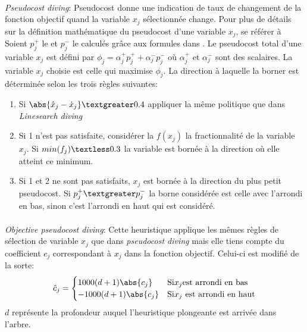 \documentclass[12pt,a4paper,oneside]{book}
\theoremstyle{definition}
\begin{document}
	\paragraph{}
	\textit{Pseudocost diving}: Pseudocost donne une indication de taux de changement de la fonction objectif quand la variable $x_j$ sélectionnée change.
	Pour plus de détails sur la définition mathématique du pseudocost d'une variable $x_j$, se référer à \cite{martin1999integer}
	Soient $p^+_j$ le  et $p^-_j$ le  calculés grâce aux formules dans \cite{martin1999integer}. Le pseudocost total d'une variable $x_j$ est défini par $ \phi_j = \alpha^+_j p^+_j + \alpha^-_j p^-_j$ où $\alpha^+_j$ et $\alpha^-_j$ sont des scalaires. La variable $x_j$ choisie est celle qui maximise $\phi_j$. La direction à laquelle la borner est déterminée selon les trois règles suivantes:
	\begin{enumerate}
		\item Si $\abs{\hat{x}_j - \dot{x}_j} \textgreater 0.4$ appliquer la même politique que dans \textit{Linesearch diving}
		\item Si 1 n'est pas satisfaite, considérer la $f(x_j)$ la fractionnalité de la variable $x_j$. Si $min(f_j) \textless 0.3$ la variable est bornée à la direction où elle atteint ce minimum.
		\item Si 1 et 2 ne sont pas satisfaits, $x_j$ est bornée à la direction du plus petit pseudocost. Si $p^+_j \textgreater p^-_j$ la borne considérée est celle avec l'arrondi en bas, sinon c'est l'arrondi en haut qui est considéré. 
	\end{enumerate}
	
	\paragraph{}
	\textit{Objective pseudocost diving}: Cette heuristique applique les mêmes règles de sélection de variable $x_j$ que dans \textit{pseudocost diving} mais elle tiens compte du coefficient $c_j$ correspondant à $x_j$ dans la fonction objectif. Celui-ci est modifié de la sorte:
	\[
		\hat{c}_j = \begin{cases}
				1000 (d+1) \abs{c_j} & \text{Si} x_j \text{est arrondi en bas} \\
				-1000 (d+1) \abs{c_j} & \text{Si} x_j \text{ est arrondi en haut} \\
		\end{cases}
	\]
	$d$ représente la profondeur auquel l'heuristique plongeante est arrivée dans l'arbre.
	
\end{document}
